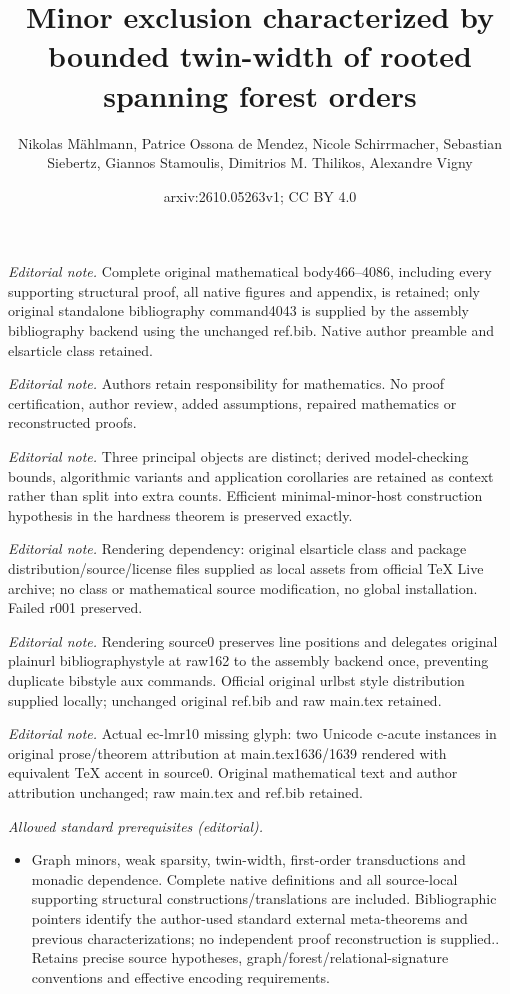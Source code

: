 \documentclass[1p,number,11pt]{elsarticle}
\title{Minor exclusion characterized by bounded twin-width of rooted spanning forest orders}
\author{Nikolas Mählmann, Patrice Ossona de Mendez, Nicole Schirrmacher, Sebastian Siebertz, Giannos Stamoulis, Dimitrios M. Thilikos, Alexandre Vigny}
\date{arxiv:2610.05263v1; CC BY 4.0}
\theoremstyle{plain}
\begin{document}
\maketitle
\noindent\textit{Editorial note.} Complete original mathematical body466--4086, including every supporting structural proof, all native figures and appendix, is retained; only original standalone bibliography command4043 is supplied by the assembly bibliography backend using the unchanged ref.bib. Native author preamble and elsarticle class retained.\par\medskip
\noindent\textit{Editorial note.} Authors retain responsibility for mathematics. No proof certification, author review, added assumptions, repaired mathematics or reconstructed proofs.\par\medskip
\noindent\textit{Editorial note.} Three principal objects are distinct; derived model-checking bounds, algorithmic variants and application corollaries are retained as context rather than split into extra counts. Efficient minimal-minor-host construction hypothesis in the hardness theorem is preserved exactly.\par\medskip
\noindent\textit{Editorial note.} Rendering dependency: original elsarticle class and package distribution/source/license files supplied as local assets from official TeX Live archive; no class or mathematical source modification, no global installation. Failed r001 preserved.\par\medskip
\noindent\textit{Editorial note.} Rendering source0 preserves line positions and delegates original plainurl bibliographystyle at raw162 to the assembly backend once, preventing duplicate bibstyle aux commands. Official original urlbst style distribution supplied locally; unchanged original ref.bib and raw main.tex retained.\par\medskip
\noindent\textit{Editorial note.} Actual ec-lmr10 missing glyph: two Unicode c-acute instances in original prose/theorem attribution at main.tex1636/1639 rendered with equivalent TeX accent in source0. Original mathematical text and author attribution unchanged; raw main.tex and ref.bib retained.\par\medskip
\noindent\textit{Allowed standard prerequisites (editorial).}\begin{itemize}
\item Graph minors, weak sparsity, twin-width, first-order transductions and monadic dependence. Complete native definitions and all source-local supporting structural constructions/translations are included. Bibliographic pointers identify the author-used standard external meta-theorems and previous characterizations; no independent proof reconstruction is supplied.. Retains precise source hypotheses, graph/forest/relational-signature conventions and effective encoding requirements.
\end{itemize}\medskip
\end{document}
